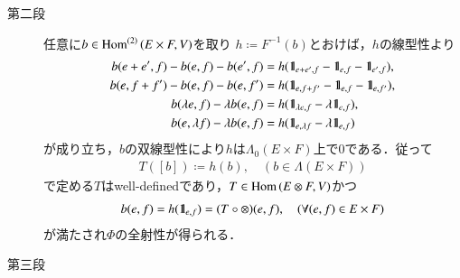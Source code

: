 \begin{prf}
\begin{description}
			\item[第二段]
				任意に$b \in \mathrm{Hom}^{(2)} \left(E \times F,V\right)$を取り
				$h \coloneqq F^{-1}(b)$とおけば，$h$の線型性より
				\begin{align}
					b(e+e',f) - b(e,f) - b(e',f)
					&= h(\defunc_{e+e',f} - \defunc_{e,f} - \defunc_{e',f}), \\
					b(e,f+f') - b(e,f) - b(e,f')
					&= h(\defunc_{e,f+f'} - \defunc_{e,f} - \defunc_{e,f'}), \\
					b(\lambda e,f) - \lambda b(e,f)
					&= h(\defunc_{\lambda e,f} - \lambda \defunc_{e,f}), \\
					b(e,\lambda f) - \lambda b(e,f)
					&= h(\defunc_{e,\lambda f} - \lambda \defunc_{e,f})
				\end{align}
				が成り立ち，$b$の双線型性により$h$は$\Lambda_0(E \times F)$上で0である．従って
				\begin{align}
					T([b]) \coloneqq h(b),
					\quad (b \in \Lambda(E \times F))
				\end{align}
				で定める$T$はwell-definedであり，$T \in \mathrm{Hom} \left(E \otimes F,V\right)$かつ
				\begin{align}	
					b(e,f) = h(\mbox{1}\hspace{-0.25em}\mbox{l}_{e,f}) = (T \circ \otimes) (e,f),
					\quad (\forall (e,f) \in E \times F)
				\end{align}
				が満たされ$\Phi$の全射性が得られる．
				
			\item[第三段]
				
		\end{description}
	\end{prf}
